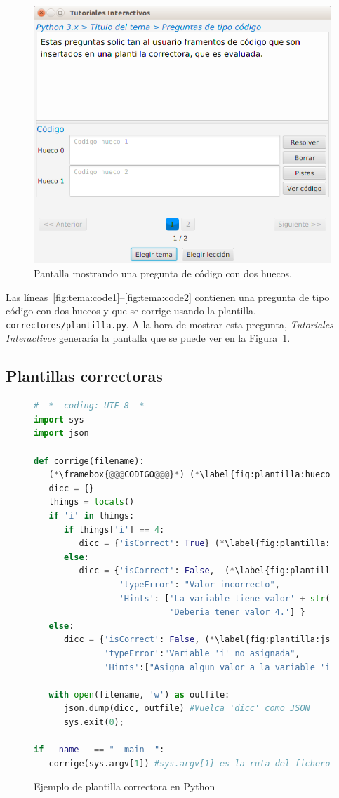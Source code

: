 \documentclass[]{article}
\newcommand{\code}[1]{{\lstinline[basicstyle=\ttfamily,mathescape]!#1!}}
\newcommand{\toolname}{\emph{Tutoriales Interactivos}}
\begin{document}
\begin{figure}[tb]
	\centerline{\includegraphics[scale=0.5]{codigo}}
	\caption{Pantalla mostrando una pregunta de código con dos huecos.\label{fig:codigo}}
\end{figure}

Las líneas~\ref{fig:tema:code1}--\ref{fig:tema:code2} contienen una pregunta de tipo código con dos huecos y que se corrige usando la plantilla. \code{correctores/plantilla.py}. A la hora de mostrar esta pregunta, \toolname{} generaría la pantalla que se puede ver en la Figura~\ref{fig:codigo}.

\subsection{Plantillas correctoras}\label{sec:plantillas}
\begin{figure}[tb]
\begin{lstlisting}[language=Python,basicstyle=\ttfamily, otherkeywords={with}]
# -*- coding: UTF-8 -*-
import sys
import json
	
def corrige(filename):
   (*\framebox{@@@CODIGO@@@}*) (*\label{fig:plantilla:hueco}*)
   dicc = {}
   things = locals()
   if 'i' in things:
      if things['i'] == 4:
         dicc = {'isCorrect': True} (*\label{fig:plantilla:json1}*)
      else:
         dicc = {'isCorrect': False,  (*\label{fig:plantilla:json2}*)
                 'typeError': "Valor incorrecto", 
                 'Hints': ['La variable tiene valor' + str(i),
                           'Deberia tener valor 4.'] }
   else:
      dicc = {'isCorrect': False, (*\label{fig:plantilla:json3}*)
              'typeError':"Variable 'i' no asignada", 
              'Hints':["Asigna algun valor a la variable 'i'"]}
	
   with open(filename, 'w') as outfile:
      json.dump(dicc, outfile) #Vuelca 'dicc' como JSON
      sys.exit(0);    
	
if __name__ == "__main__":
   corrige(sys.argv[1]) #sys.argv[1] es la ruta del fichero JSON
\end{lstlisting}	
\caption{Ejemplo de plantilla correctora en Python\label{fig:plantilla}}
\end{figure}
\end{document}
